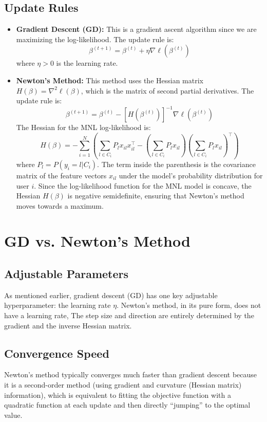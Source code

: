 \documentclass[11pt, a4paper, oneside]{memoir}
\begin{document}
\subsection{Update Rules}
\begin{itemize}
  \item \textbf{Gradient Descent (GD):} This is a gradient ascent algorithm since we are maximizing the log-likelihood. The update rule is:
    \[ \beta^{(t+1)} = \beta^{(t)} + \eta \nabla\ell(\beta^{(t)}) \]
    where $\eta > 0$ is the learning rate.
  \item \textbf{Newton's Method:} This method uses the Hessian matrix $H(\beta) = \nabla^2 \ell(\beta)$, which is the matrix of second partial derivatives. The update rule is:
    \[ \beta^{(t+1)} = \beta^{(t)} - [H(\beta^{(t)})]^{-1} \nabla\ell(\beta^{(t)}) \]
    The Hessian for the MNL log-likelihood is:
    \[ H(\beta) = -\sum_{i=1}^{N} \left( \sum_{l \in C_i} P_l x_{il} x_{il}^\top - \left(\sum_{l \in C_i} P_l x_{il}\right) \left(\sum_{l \in C_i} P_l x_{il}\right)^\top \right) \]
    where $P_l = P(y_i = l | C_i)$. The term inside the parenthesis is the covariance matrix of the feature vectors $x_{il}$
    under the model's probability distribution for user $i$.
    Since the log-likelihood function for the MNL model is concave,
    the Hessian $H(\beta)$ is negative semidefinite, ensuring that Newton's method moves towards a maximum.
\end{itemize}

\section{GD vs. Newton's Method}
\subsection{Adjustable Parameters}
As mentioned earlier, gradient descent (GD) has one key adjustable hyperparameter: the learning rate $\eta$.
Newton's method, in its pure form, does not have a learning rate\footnotemark,
The step size and direction are entirely determined by the gradient and the inverse Hessian matrix.

\subsection{Convergence Speed}
Newton's method typically converges much faster than gradient descent because it is a second-order method (using gradient and curvature (Hessian matrix) information),
which is equivalent to fitting the objective function with a quadratic function at each update and then directly ``jumping'' to the optimal value.
\end{document}
